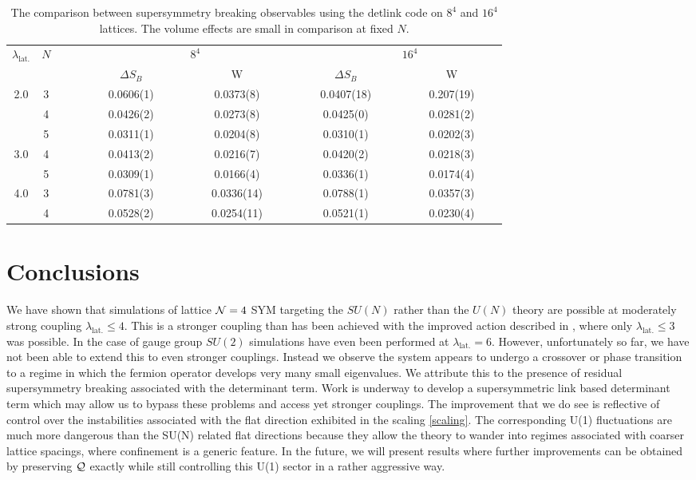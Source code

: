 \begin{table}
\begin{center}
\begin{tabular}{cccccccl} 
\hline\hline
$\lambda_{\text{lat.}}$ & $N$ &  ~~~~~~~~~~~~~~~~~~~~~~~$8^{4}$  &  & ~~~~~~~~~~~~~~~~~~~~~~~$16^{4}$  \\ 
\cline{1-2}
 & & $\Delta S_{B}$ & W  & $\Delta S_{B}$  & W  \\
 \hline 
2.0 & 3 & 0.0606(1)   &  0.0373(8)  & 0.0407(18)   & 0.207(19) \\
& 4 & 0.0426(2) & 0.0273(8) & 0.0425(0) &  0.0281(2)  \\
& 5 &  0.0311(1) &  0.0204(8) & 0.0310(1)   & 0.0202(3)  \\
\hline
3.0 & 4 & 0.0413(2) & 0.0216(7) & 0.0420(2)  & 0.0218(3) \\
& 5 & 0.0309(1)  & 0.0166(4) & 0.0336(1) &  0.0174(4)  \\
\hline
4.0 & 3 & 0.0781(3)  & 0.0336(14) & 0.0788(1)   & 0.0357(3) \\
& 4 & 0.0528(2)  & 0.0254(11) & 0.0521(1) &  0.0230(4)  \\
\hline  \hline
\end{tabular}
\end{center}
\caption{
\label{tab:ward-hybrid2} 
The comparison between supersymmetry breaking observables using the detlink code on $8^4$ and $16^4$ lattices. The volume effects are small
in comparison at fixed $N$.} 
\end{table}

\section{Conclusions}
We have shown that simulations of lattice ${\cal N}=4$ SYM targeting the 
$SU(N)$ rather than the $U(N)$ theory are possible at moderately strong coupling $\lambda_{\text{lat.}} \le 4$. This
is a stronger coupling than has been achieved with the improved action described in \cite{Catterall:2015ira},
where only $\lambda_{\text{lat.}}\le 3$ was possible. 
In the case of gauge group $SU(2)$ simulations have even been performed at $\lambda_{\text{lat.}}=6$. However, unfortunately so far, 
we have not been able to extend this to even stronger couplings. Instead we observe the system appears to undergo a crossover
or phase transition to a regime in which the fermion operator develops very many small eigenvalues. We attribute this
to the presence of residual supersymmetry breaking associated with the determinant term. Work is underway to
develop a supersymmetric link based determinant term which may allow us to bypass these
problems and access yet stronger couplings.  The improvement that we do see is reflective of control
over the instabilities associated with the flat direction exhibited in the scaling \ref{scaling}.
The corresponding U(1) fluctuations are much more dangerous than the SU(N) related
flat directions because they allow the theory to wander into regimes associated with coarser
lattice spacings, where confinement is a generic feature.  In the future, we will
present results where further improvements can be obtained by preserving $\mathcal Q$ exactly
while still controlling this U(1) sector in a rather aggressive way.
